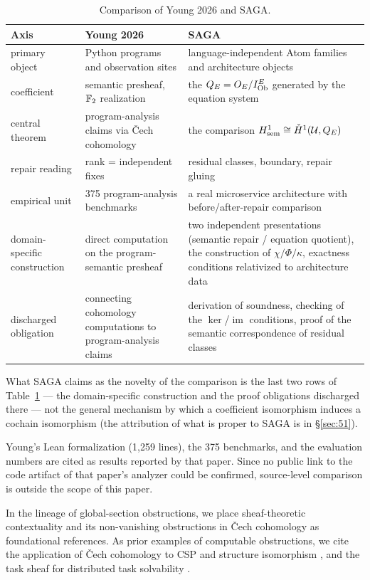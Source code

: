 \begin{table}[htbp]
\centering
\scriptsize
\begin{tabular}{@{}p{}p{}p{}@{}}
\toprule
Axis & Young 2026 & SAGA \\
\midrule
primary object & Python programs and observation sites &
language-independent Atom families and architecture objects \\
coefficient & semantic presheaf, $\mathbb{F}_{2}$ realization & the
$Q_{E}=O_{E}/I_{\mathrm{Ob}}^{E}$ generated by the equation system \\
central theorem & program-analysis claims via \v{C}ech cohomology &
the comparison $H^1_{\mathrm{sem}} \cong \check H^1(\mathcal{U},Q_{E})$ \\
repair reading & rank = independent fixes & residual classes,
boundary, repair gluing \\
empirical unit & 375 program-analysis benchmarks & a real microservice
architecture with before/after-repair comparison \\
domain-specific construction & direct computation on the
program-semantic presheaf & two independent presentations (semantic
repair / equation quotient), the construction of $\chi/\Phi/\kappa$,
exactness conditions relativized to architecture data \\
discharged obligation & connecting cohomology computations to
program-analysis claims & derivation of soundness, checking of the
$\ker$/$\operatorname{im}$ conditions, proof of the semantic
correspondence of residual classes \\
\bottomrule
\end{tabular}
\caption{Comparison of Young 2026 and SAGA.}
\label{tab:young}
\end{table}

What SAGA claims as the novelty of the comparison is the last two rows
of Table~\ref{tab:young} --- the domain-specific construction and the proof
obligations discharged there --- not the general mechanism by which a
coefficient isomorphism induces a cochain isomorphism (the attribution
of what is proper to SAGA is in \S\ref{sec:51}).

Young's Lean formalization (1{,}259 lines), the 375 benchmarks, and
the evaluation numbers are cited as results reported by that paper.
Since no public link to the code artifact of that paper's analyzer
could be confirmed, source-level comparison is outside the scope of
this paper.

In the lineage of global-section obstructions, we place
sheaf-theoretic contextuality \citep{abramsky2011sheaf} and its
non-vanishing obstructions in \v{C}ech cohomology
\citep{abramsky2012cohomology} as foundational references. As prior
examples of computable obstructions, we cite the application of
\v{C}ech cohomology to CSP and structure isomorphism
\citep{oconghaile2022cohomology}, and the task sheaf for distributed
task solvability \citep{felber2025sheaf}.

